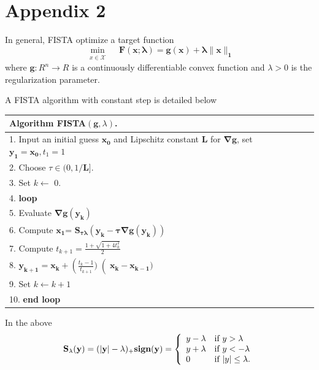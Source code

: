 \documentclass[fleqn]{article}
\begin{document}
\section*{Appendix 2}
\label{sec:appendix2}
In general, FISTA optimize a target function
\begin{equation}\label{eqn: fistatarget}
\min_{\substack{x\in \mathcal{X}}}\quad \mathbf{F(x;\lambda)} = \mathbf{g(x)}+ \mathbf{\lambda \|x\|_1}
\end{equation}
where $\mathbf{g}: R^n \rightarrow R $ is a continuously differentiable convex function and $\lambda > 0$ is the regularization parameter.

A FISTA algorithm with constant step is detailed below\\

\begin{tabular}{l}
\hline
\textbf{Algorithm } FISTA$(\mathbf{g},\lambda)$.\\
\hline
 1. Input an initial guess $\mathbf{x_0}$ and Lipschitz constant $\mathbf{L}$ for $\mathbf{\nabla g}$, set $\mathbf{y_1} = \mathbf{x_0},t_1 = 1$\\
 2. Choose $\tau \in (0,1/\mathbf{L}]$.\\
 3. Set $k \leftarrow$ 0.\\
 4. \textbf{loop}\\
 5. \hspace{10mm}		Evaluate $\mathbf{\nabla g(y_k)}$\\
 6.	\hspace{10mm}	Compute $\mathbf{x_{1}}$= $\mathbf{S_{\tau\lambda}(y_k - \tau\nabla g(y_k))}$\\
 7.	\hspace{10mm}	Compute $t_{k+1} = \frac{1+\sqrt{1 + 4 t_k^2}}{2}$\\
 8.	\hspace{10mm}	$\mathbf{y_{k+1}} = \mathbf{x_k} + \left(\frac{t_k - 1}{t_{k+1}})\right (\mathbf{x_k}-\mathbf{x_{k-1}})$\\
 9.	\hspace{10mm}	Set $k \leftarrow k+1$ \\
 10. \textbf{end loop}\\
\hline
\end{tabular}


\vspace*{10mm}
In the above
\[
\mathbf{S_\lambda (y) = (|y|-\lambda)_{+}\textbf{sign}(y)}=\left\{
\begin{array}{l l }
 y - \lambda & \text{if   } y > \lambda\\
 y + \lambda & \text{if   } y < -\lambda\\
 0 & \text{if   } |y| \leq \lambda .
\end{array}
\right.
\]


\newpage


\end{document}
